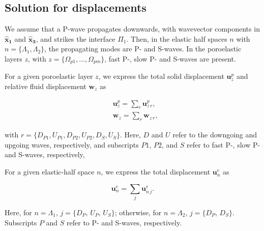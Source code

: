 \documentclass[draft]{agujournal2019}
\begin{document}
\subsection{Solution for displacements}
We assume that a P-wave propagates downwards, with wavevector components in $\bm{\hat x_1}$ and  $\bm{\hat x_3}$, and strikes the interface $\Pi_1$.  Then,  in the elastic half spaces $n$ with $n =\{\Lambda_1,\Lambda_2\}$, the propagating modes  are P- and S-waves. In the poroelastic layers $z$, with $z=\{\Omega_{p1},\dots,\Omega_{pm}\}$, fast P-, slow P- and S-waves are present.

For a given poroelastic layer $z$, we express the total solid displacement $\bm{u}_z^p$  and relative fluid displacement $\bm{w}_z$ as
\begin{linenomath*}
\begin{equation}\label{Eq.a7}
\begin{split}
& \bm{u}_z^{p} =  \sum_r \bm{u}_{z\,r}^p, \\
& \bm{w}_z =  \sum_r \bm{w}_{z\,r},
\end{split}
\end{equation}
\end{linenomath*}
with $r=\{D_{P1},U_{P1},D_{P2},U_{P2},D_{S},U_{S}\}$. Here, $D$ and $U$ refer to the downgoing and upgoing waves, respectively, and subscripts $P1$, $P2$, and $S$ refer to fast P-, slow P- and S-waves, respectively,

For a given elastic-half space $n$,  we express the total displacement $\bm{u}_n^e$ as
\begin{linenomath*}
\begin{equation}\label{Eq.a8}
\bm{u}_n^{e} =  \sum_j \bm{u}_{n\,j}^e.
\end{equation}
\end{linenomath*}
Here, for $n =\Lambda_1 $,  $j=\{D_P,\,U_P,\,U_S\}$; otherwise, for $n =\Lambda_2 $, $j=\{D_P,\,D_S\}$. Subscripts $P$  and $S$ refer to P- and S-waves, respectively. 
\end{document}
